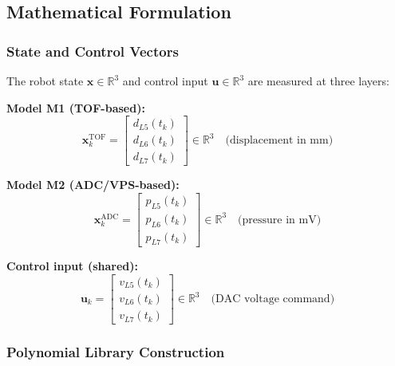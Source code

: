\documentclass[11pt,a4paper]{article}
\begin{document}
\subsection{Mathematical Formulation}

\subsubsection{State and Control Vectors}

The robot state $\mathbf{x} \in \mathbb{R}^3$ and control input $\mathbf{u} \in \mathbb{R}^3$
are measured at three layers:

\begin{equationbox}
\textbf{Model M1 (TOF-based):}
\begin{equation}
    \mathbf{x}_k^{\text{TOF}} = \begin{bmatrix} d_{L5}(t_k) \\ d_{L6}(t_k) \\ d_{L7}(t_k) \end{bmatrix} \in \mathbb{R}^3
    \quad\text{(displacement in mm)}
    \label{eq:state_tof}
\end{equation}

\textbf{Model M2 (ADC/VPS-based):}
\begin{equation}
    \mathbf{x}_k^{\text{ADC}} = \begin{bmatrix} p_{L5}(t_k) \\ p_{L6}(t_k) \\ p_{L7}(t_k) \end{bmatrix} \in \mathbb{R}^3
    \quad\text{(pressure in mV)}
    \label{eq:state_adc}
\end{equation}

\textbf{Control input (shared):}
\begin{equation}
    \mathbf{u}_k = \begin{bmatrix} v_{L5}(t_k) \\ v_{L6}(t_k) \\ v_{L7}(t_k) \end{bmatrix} \in \mathbb{R}^3
    \quad\text{(DAC voltage command)}
    \label{eq:control}
\end{equation}
\end{equationbox}

\subsubsection{Polynomial Library Construction}
\end{document}
